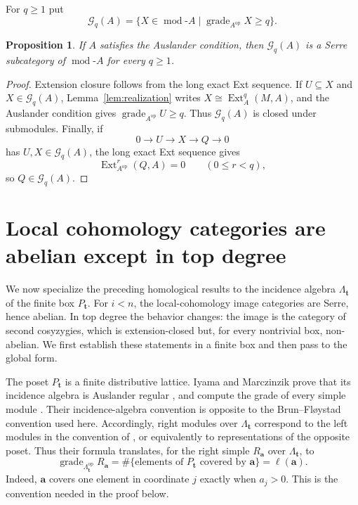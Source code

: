 \documentclass[10pt,a4paper]{amsart}
\newtheorem{proposition}[theorem]{Proposition}
\newcommand{\Ext}{\operatorname{Ext}}
\newcommand{\grade}{\operatorname{grade}}
\newcommand{\modcat}{\operatorname{mod}}
\begin{document}
For $q\ge1$ put
\[
\mathcal G_q(A)
=
\{X\in\modcat\text{-}A\mid \grade_{A^{\mathrm{op}}} X\ge q\}.
\]

\begin{proposition}\label{prop:grade-serre}
If $A$ satisfies the Auslander condition, then $\mathcal G_q(A)$ is a Serre subcategory of $\modcat\text{-}A$ for every $q\ge1$.
\end{proposition}

\begin{proof}
Extension closure follows from the long exact Ext sequence.  If $U\subseteq X$ and $X\in\mathcal G_q(A)$, Lemma~\ref{lem:realization} writes $X\cong\Ext_A^q(M,A)$, and the Auslander condition gives $\grade_{A^{\mathrm{op}}} U\ge q$.  Thus $\mathcal G_q(A)$ is closed under submodules.  Finally, if
\[
0\longrightarrow U\longrightarrow X\longrightarrow Q\longrightarrow0
\]
has $U,X\in\mathcal G_q(A)$, the long exact Ext sequence gives
\[
\Ext^r_{A^{\mathrm{op}}}(Q,A)=0
\qquad (0\le r<q),
\]
so $Q\in\mathcal G_q(A)$.
\end{proof}

\section{Local cohomology categories are abelian except in top degree}\label{sec:finitebox}

We now specialize the preceding homological results to the incidence algebra
$\Lambda_{\mathbf t}$ of the finite box $P_{\mathbf t}$.  For $i<n$, the
local-cohomology image categories are Serre, hence abelian.  In top degree the
behavior changes: the image is the category of second cosyzygies, which is
extension-closed but, for every nontrivial box, non-abelian.  We first establish
these statements in a finite box and then pass to the global form.

The poset $P_{\mathbf t}$ is a finite distributive lattice.  Iyama and
Marczinzik prove that its incidence algebra is Auslander regular
\cite[Theorem~3.2]{IM}, and compute the grade of every simple module
\cite[Corollary~3.3]{IM}.  Their incidence-algebra convention is opposite to
the Brun--Fl\o ystad convention used here.  Accordingly, right modules over
$\Lambda_{\mathbf t}$ correspond to the left modules in the convention of
\cite{IM}, or equivalently to representations of the opposite poset.  Thus
their formula translates, for the right simple $R_{\mathbf a}$ over
$\Lambda_{\mathbf t}$, to
\[
\grade_{\Lambda_{\mathbf t}^{\mathrm{op}}}R_{\mathbf a}
=
\#\{\text{elements of $P_{\mathbf t}$ covered by $\mathbf a$}\}
=
\ell(\mathbf a).
\]
Indeed, $\mathbf a$ covers one element in coordinate $j$ exactly when
$a_j>0$.  This is the convention needed in the proof below.
\end{document}
